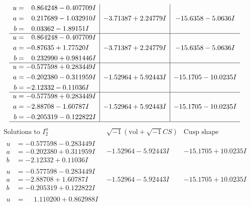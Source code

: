 \documentclass[1p]{elsarticle_modified}
\theoremstyle{definition}
\newcommand{\I}{\sqrt{-1}}
\begin{document}
$$\begin{array}{c|c|c}
\begin{aligned}
u &= \phantom{-}0.864248 - 0.407709 I \\
a &= \phantom{-}0.217689 - 1.032910 I \\
b &= \phantom{-}0.03362 - 1.89151 I\end{aligned}
 & -3.71387 + 2.24779 I & -15.6358 - 5.0636 I \\ \hline\begin{aligned}
u &= \phantom{-}0.864248 - 0.407709 I \\
a &= -0.87635 + 1.77520 I \\
b &= \phantom{-}0.232990 + 0.981446 I\end{aligned}
 & -3.71387 + 2.24779 I & -15.6358 - 5.0636 I \\ \hline\begin{aligned}
u &= -0.577598 + 0.283449 I \\
a &= -0.202380 - 0.311959 I \\
b &= -2.12332 - 0.11036 I\end{aligned}
 & -1.52964 + 5.92443 I & -15.1705 - 10.0235 I \\ \hline\begin{aligned}
u &= -0.577598 + 0.283449 I \\
a &= -2.88708 - 1.60787 I \\
b &= -0.205319 - 0.122822 I\end{aligned}
 & -1.52964 + 5.92443 I & -15.1705 - 10.0235 I\\
 \hline 
 \end{array}$$\newpage$$\begin{array}{c|c|c}  
\text{Solutions to }I^u_{2}& \I (\text{vol} + \sqrt{-1}CS) & \text{Cusp shape}\\
 \hline 
\begin{aligned}
u &= -0.577598 - 0.283449 I \\
a &= -0.202380 + 0.311959 I \\
b &= -2.12332 + 0.11036 I\end{aligned}
 & -1.52964 - 5.92443 I & -15.1705 + 10.0235 I \\ \hline\begin{aligned}
u &= -0.577598 - 0.283449 I \\
a &= -2.88708 + 1.60787 I \\
b &= -0.205319 + 0.122822 I\end{aligned}
 & -1.52964 - 5.92443 I & -15.1705 + 10.0235 I \\ \hline\begin{aligned}
u &= \phantom{-}1.110200 + 0.862988 I \\

\end{aligned}
\end{array}$$
\end{document}
